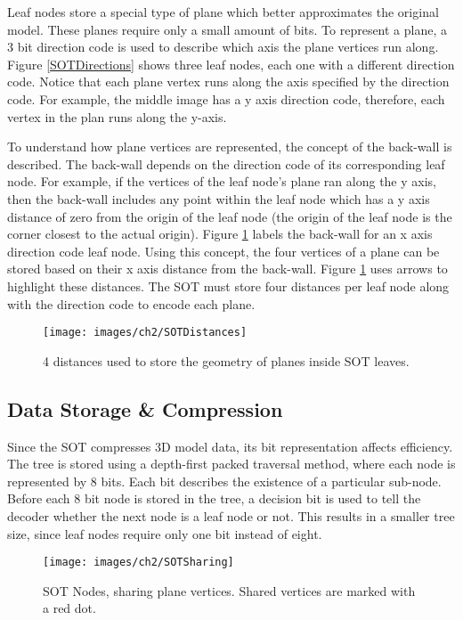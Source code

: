 Leaf nodes store a special type of plane which better approximates the original model. These planes require only a small amount of bits. To represent a plane, a 3 bit direction code is used to describe which axis the plane vertices run along. Figure \ref{SOTDirections} shows three leaf nodes, each one with a different direction code.  Notice that each plane vertex runs along the axis specified by the direction code. For example, the middle image has a y axis direction code, therefore, each vertex in the plan runs along the y-axis.

To understand how plane vertices are represented, the concept of the back-wall is described. The back-wall depends on the direction code of its corresponding leaf node. For example, if the vertices of the leaf node's plane ran along the y axis, then the back-wall includes any point within the leaf node which has a y axis distance of zero from the origin of the leaf node (the origin of the leaf node is the corner closest to the actual origin). Figure \ref{SOTDistances} labels the back-wall for an x axis direction code leaf node. Using this concept, the four vertices of a plane can be stored based on their x axis distance from the back-wall. Figure \ref{SOTDistances} uses arrows to highlight these distances. The SOT must store four distances per leaf node along with the direction code to encode each plane. 

\begin{figure}[!h]
\centering
\texttt{[image: images/ch2/SOTDistances]}
\caption{4 distances used to store the geometry of planes inside SOT leaves.}
\label{SOTDistances}
\end{figure}

\subsection{Data Storage \& Compression}

Since the SOT compresses 3D model data, its bit representation affects efficiency. The tree is stored using a depth-first packed traversal method, where each node is represented by 8 bits. Each bit describes the existence of a particular sub-node. Before each 8 bit node is stored in the tree, a decision bit is used to tell the decoder whether the next node is a leaf node or not. This results in a smaller tree size, since leaf nodes require only one bit instead of eight. 

\begin{figure}[!h]
\centering
\texttt{[image: images/ch2/SOTSharing]}
\caption{SOT Nodes, sharing plane vertices. Shared vertices are marked with a red dot.}
\label{SOTSharing}
\end{figure}

